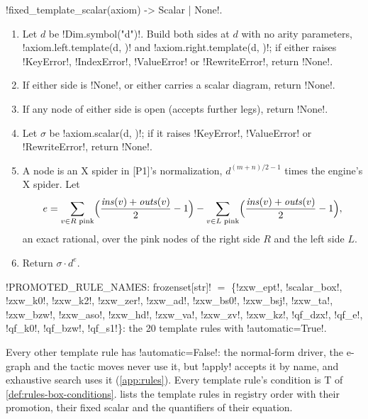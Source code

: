 \begin{algorithm}\label{alg:rules-fixed-scalar}
\py!fixed_template_scalar(axiom) -> Scalar | None!.
\begin{enumerate}
\item Let $d$ be \py!Dim.symbol("d")!. Build both sides at $d$ with no arity parameters, \py!axiom.left.template(d, {})! and \py!axiom.right.template(d, {})!; if either raises \py!KeyError!, \py!IndexError!, \py!ValueError! or \py!RewriteError!, return \py!None!.
\item If either side is \py!None!, or either carries a scalar diagram, return \py!None!.
\item If any node of either side is open (accepts further legs), return \py!None!.
\item Let $\sigma$ be \py!axiom.scalar(d, {})!; if it raises \py!KeyError!, \py!ValueError! or \py!RewriteError!, return \py!None!.
\item A  node is an X spider in [P1]'s normalization, $d^{(m+n)/2-1}$ times the engine's X spider. Let
\[e=\sum_{v\in R\text{ pink}}\Bigl(\frac{\mathit{ins}(v)+\mathit{outs}(v)}{2}-1\Bigr)-\sum_{v\in L\text{ pink}}\Bigl(\frac{\mathit{ins}(v)+\mathit{outs}(v)}{2}-1\Bigr),\]
an exact rational, over the pink nodes of the right side $R$ and the left side $L$.
\item Return $\sigma\cdot d^{e}$.
\end{enumerate}
\end{algorithm}

\begin{signature}
\py!PROMOTED_RULE_NAMES: frozenset[str]! $=$ \{\azx!zxw_ept!, \azx!scalar_box!, \azx!zxw_k0!, \azx!zxw_k2!, \azx!zxw_zer!, \azx!zxw_ad!, \azx!zxw_bs0!, \azx!zxw_bsj!, \azx!zxw_ta!, \azx!zxw_bzw!, \azx!zxw_aso!, \azx!zxw_hd!, \azx!zxw_va!, \azx!zxw_zv!, \azx!zxw_kz!, \azx!qf_dzx!, \azx!qf_e!, \azx!qf_k0!, \azx!qf_bzw!, \azx!qf_s1!\}: the 20 template rules with \py!automatic=True!.
\end{signature}

Every other template rule has \py!automatic=False!: the normal-form driver, the e-graph and the tactic moves never use it, but \azx!apply! accepts it by name, and exhaustive search uses it (\cref{app:rules}). Every template rule's \bbox{} condition is T of \cref{def:rules-box-conditions}.  lists the template rules in registry order with their promotion, their fixed scalar and the quantifiers of their equation.

